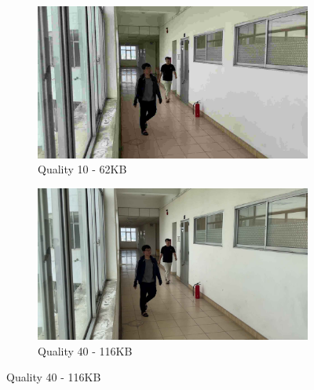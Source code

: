 \begin{figure}[htbp]
    \centering
    \begin{subfigure}{0.45\textwidth}
        \centering
        \includegraphics[width=\textwidth]{Figure/frame_0_quality_10.jpg}
        \caption{Quality 10 - 62KB}
        \label{fig:quality_10}
    \end{subfigure}
    \hfill
    \begin{subfigure}{0.45\textwidth}
        \centering
        \includegraphics[width=\textwidth]{Figure/frame_0_quality_40.jpg}
        \caption{Quality 40 - 116KB}
        \label{fig:quality_40}
    \end{subfigure}
    
    \vspace{0.5cm}
    

\end{figure}
